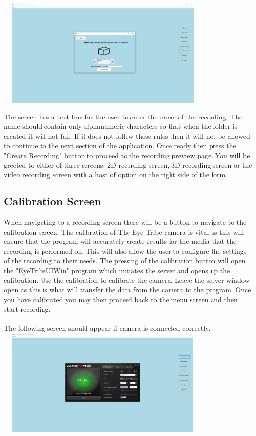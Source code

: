 \includegraphics[width=400px,height=200px]{./Images/ModelSelect.PNG}

The screen has a text box for the user to enter the name of the recording. The name should contain only alphanumeric characters so that when the folder is created it will not fail. If it does not follow these rules then it will not be allowed to continue to the next section of the application. Once ready then press the "Create Recording" button to proceed to the recording preview page. You will be greeted to either of three screens: 2D recording screen, 3D recording screen or the video recording screen with a host of option on the right side of the form.


\subsection{Calibration Screen}
When navigating to a recording screen there will be a button to navigate to the calibration screen. The calibration of The Eye Tribe camera is vital as this will ensure that the program will accurately create results for the media that the recording is performed on. This will also allow the user to configure the settings of the recording to their needs. The pressing of the calibration button will open the "EyeTribeUIWin" program which initiates the server and opens up the calibration. Use the calibration to calibrate the camera. Leave the server window open as this is what will transfer the data from the camera to the program. Once you have calibrated you may then proceed back to the menu screen and then start recording.
\\ \\ 
The following screen should appear if camera is connected correctly.\\
\includegraphics[width=400px,height=200px]{./Images/EyeCalibration.PNG}\\

